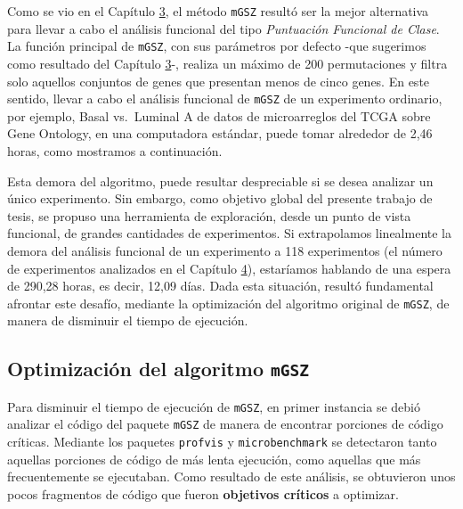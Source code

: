 \documentclass[12pt,twoside]{reedthesis}
\begin{document}
\par

Como se vio en el Capítulo \protect\hyperlink{cap:ifa}{3}, el método \texttt{mGSZ} resultó ser la mejor alternativa para llevar a cabo el análisis funcional del tipo \emph{Puntuación Funcional de Clase}. La función principal de \texttt{mGSZ}, con sus parámetros por defecto -que sugerimos como resultado del Capítulo \protect\hyperlink{cap:ifa}{3}-, realiza un máximo de 200 permutaciones y filtra solo aquellos conjuntos de genes que presentan menos de cinco genes. En este sentido, llevar a cabo el análisis funcional de \texttt{mGSZ} de un experimento ordinario, por ejemplo, Basal vs.~Luminal A de datos de microarreglos del TCGA sobre Gene Ontology, en una computadora estándar, puede tomar alrededor de 2,46 horas, como mostramos a continuación.

\par

Esta demora del algoritmo, puede resultar despreciable si se desea analizar un único experimento. Sin embargo, como objetivo global del presente trabajo de tesis, se propuso una herramienta de exploración, desde un punto de vista funcional, de grandes cantidades de experimentos. Si extrapolamos linealmente la demora del análisis funcional de un experimento a 118 experimentos (el número de experimentos analizados en el Capítulo \protect\hyperlink{cap:migsa}{4}), estaríamos hablando de una espera de 290,28 horas, es decir, 12,09 días. Dada esta situación, resultó fundamental afrontar este desafío, mediante la optimización del algoritmo original de \texttt{mGSZ}, de manera de disminuir el tiempo de ejecución.

\hypertarget{optimizaciuxf3n-del-algoritmo-mgsz}{%
\subsection{\texorpdfstring{Optimización del algoritmo \texttt{mGSZ}}{Optimización del algoritmo mGSZ}}\label{optimizaciuxf3n-del-algoritmo-mgsz}}

\par

Para disminuir el tiempo de ejecución de \texttt{mGSZ}, en primer instancia se debió analizar el código del paquete \texttt{mGSZ} de manera de encontrar porciones de código críticas. Mediante los paquetes \texttt{profvis} y \texttt{microbenchmark} se detectaron tanto aquellas porciones de código de más lenta ejecución, como aquellas que más frecuentemente se ejecutaban. Como resultado de este análisis, se obtuvieron unos pocos fragmentos de código que fueron \textbf{objetivos críticos} a optimizar.
\end{document}
